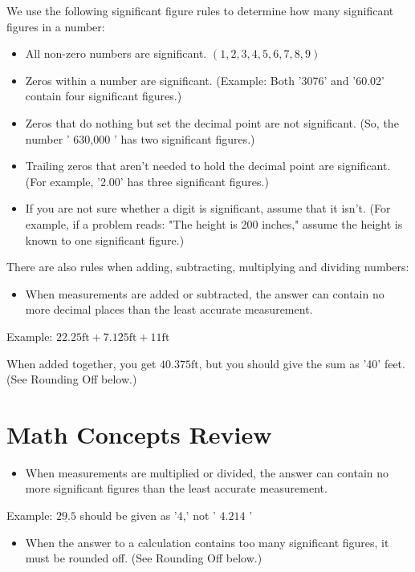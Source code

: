\documentclass[10pt]{article}
\begin{document}
We use the following significant figure rules to determine how many significant figures in a number:

\begin{itemize}
  \item All non-zero numbers are significant. $(1,2,3,4,5,6,7,8,9)$

  \item Zeros within a number are significant. (Example: Both '3076' and '60.02' contain four significant figures.)

  \item Zeros that do nothing but set the decimal point are not significant. (So, the number ' 630,000 ' has two significant figures.)

  \item Trailing zeros that aren't needed to hold the decimal point are significant. (For example, '2.00' has three significant figures.)

  \item If you are not sure whether a digit is significant, assume that it isn't. (For example, if a problem reads: "The height is 200 inches," assume the height is known to one significant figure.)

\end{itemize}
There are also rules when adding, subtracting, multiplying and dividing numbers:

\begin{itemize}
  \item When measurements are added or subtracted, the answer can contain no more decimal places than the least accurate measurement.
\end{itemize}
Example: $22.25 \mathrm{ft}+7.125 \mathrm{ft}+11 \mathrm{ft}$

When added together, you get $40.375 \mathrm{ft}$, but you should give the sum as '40' feet. (See Rounding Off below.)

\section{Math Concepts Review}
\begin{itemize}
  \item When measurements are multiplied or divided, the answer can contain no more significant figures than the least accurate measurement.
\end{itemize}
Example: $\underline{29.5}$ should be given as '4,' not ' $4.214$ '

\begin{itemize}
  \item When the answer to a calculation contains too many significant figures, it must be rounded off. (See Rounding Off below.)
\end{itemize}
\end{document}

